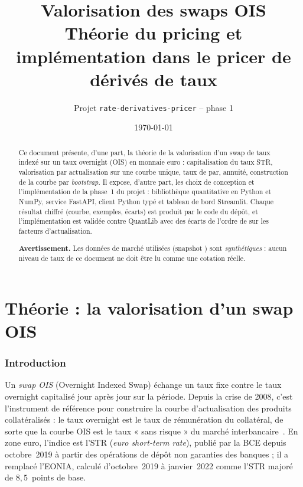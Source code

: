 \documentclass[11pt,a4paper]{article}
\title{\textbf{Valorisation des swaps OIS \estr{}}\\[0.4em]
  \large Théorie du pricing et implémentation dans le pricer de dérivés de taux}
\author{Projet \texttt{rate-derivatives-pricer} -- phase 1}
\date{\today}
\newcommand{\estr}{\texorpdfstring{\texteuro STR}{EUR STR}}
\newcommand{\code}[1]{\texttt{\detokenize{#1}}}
\theoremstyle{plain}
\theoremstyle{definition}
\theoremstyle{remark}
\begin{document}
\maketitle
\thispagestyle{empty}

\begin{abstract}
\noindent
Ce document présente, d'une part, la théorie de la valorisation d'un swap de taux indexé sur un taux
overnight (OIS) en monnaie euro : capitalisation du taux \estr{}, valorisation par actualisation sur
une courbe unique, taux de par, annuité, construction de la courbe par \emph{bootstrap}. Il expose,
d'autre part, les choix de conception et l'implémentation de la phase~1 du projet : bibliothèque
quantitative en Python et NumPy, service FastAPI, client Python typé et tableau de bord Streamlit.
Chaque résultat chiffré (courbe, exemples, écarts) est produit par le code du dépôt, et
l'implémentation est validée contre QuantLib avec des écarts de l'ordre de \MaxGapLogLinear{} sur les
facteurs d'actualisation.

\medskip\noindent
\textbf{Avertissement.} Les données de marché utilisées (snapshot \code{EUR_2026-10-19}) sont
\emph{synthétiques} : aucun niveau de taux de ce document ne doit être lu comme une cotation réelle.
\end{abstract}

\newpage
{\setlength{\parskip}{0pt}\tableofcontents}
\newpage

\part{Théorie : la valorisation d'un swap OIS}

\section{Introduction}

Un \emph{swap OIS} (Overnight Indexed Swap) échange un taux fixe contre le taux overnight capitalisé
jour après jour sur la période. Depuis la crise de 2008, c'est l'instrument de référence pour
construire la courbe d'actualisation des produits collatéralisés : le taux overnight est le taux de
rémunération du collatéral, de sorte que la courbe OIS est le taux « sans risque » du marché
interbancaire~\cite{piterbarg2010,henrard2014}. En zone euro, l'indice est l'\estr{} (\emph{euro
short-term rate}), publié par la BCE depuis octobre~2019 à partir des opérations de dépôt non
garanties des banques ; il a remplacé l'EONIA, calculé d'octobre~2019 à janvier~2022 comme l'\estr{}
majoré de $8{,}5$~points de base.
\end{document}
